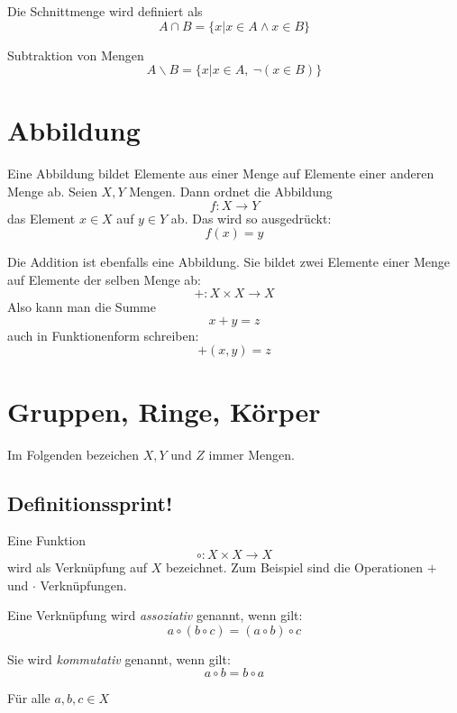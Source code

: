 \begin{definition}
Die Schnittmenge wird definiert als 
\[A \cap B = \{x| x\in A \wedge x\in B \} \]
\end{definition}

\begin{definition}
Subtraktion von Mengen
\[ A \backslash B = \{ x \vert x\in A, \  \neg (x\in B) \} \]
\end{definition}

\section{Abbildung}
Eine Abbildung bildet Elemente aus einer Menge auf Elemente einer anderen Menge ab. Seien $X,Y$ Mengen. Dann ordnet die Abbildung
\[ f : X \longrightarrow Y \]
das Element $x\in X$ auf $y\in Y$ ab. Das wird so ausgedrückt:
\[ f(x) = y\]

Die Addition ist ebenfalls eine Abbildung. Sie bildet zwei Elemente einer Menge auf Elemente der selben Menge ab:
\[ + : X \times X \longrightarrow X \]
Also kann man die Summe 
\[ x+y = z\]
auch in Funktionenform schreiben:
\[ +(x,y) = z\]

\section{Gruppen, Ringe, Körper}
Im Folgenden bezeichen $X,Y$ und $Z$ immer Mengen.

\subsection{Definitionssprint!}

\begin{definition}
Eine Funktion 
\[ \circ : X \times X \longrightarrow X \]
wird als Verknüpfung auf $X$ bezeichnet. Zum Beispiel sind die Operationen $+$ und $\cdot$ Verknüpfungen. 
\end{definition}

\begin{definition} 
Eine Verknüpfung wird \textsl{assoziativ} genannt, wenn gilt:
\[ a \circ (b \circ c) = (a \circ b) \circ c \]
\end{definition}
\begin{definition}
Sie wird \textsl{kommutativ} genannt, wenn gilt: 
\[ a \circ b = b \circ a \]
\end{definition}
Für alle $a,b,c \in X$

